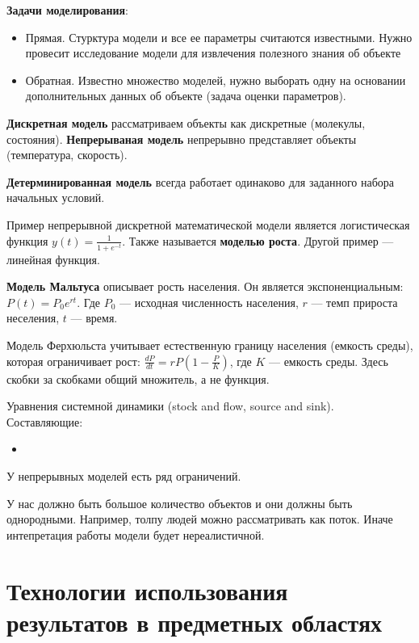 \textbf{Задачи моделирования}:
\begin{itemize}
    \item Прямая. Стурктура модели и все ее параметры считаются известными.
        Нужно провесит исследование модели для извлечения полезного знания об
        объекте

    \item Обратная. Известно множество моделей, нужно выборать одну на
        основании дополнительных данных об объекте (задача оценки параметров).
\end{itemize}

\textbf{Дискретная модель} рассматриваем объекты как дискретные (молекулы, состояния).
\textbf{Непрерываная модель} непрерывно представляет объекты (температура, скорость).

\textbf{Детерминированная модель} всегда работает одинаково для заданного набора
начальных условий.

Пример непрерывной дискретной математической модели является логистическая
функция $y(t) = \frac{1}{1 + e^{-t}}$. Также называется \textbf{моделью роста}.
Другой пример --- линейная функция.

\textbf{Модель Мальтуса} описывает рость населения. Он является экспоненциальным: $P(t)
= P_0 e^{rt}$. Где $P_0$ --- исходная численность населения, $r$ --- темп
прироста неселения, $t$ --- время.

Модель Ферхюльста учитывает естественную границу населения (емкость среды), которая
ограничивает рост: $\frac{dP}{dt} = rP(1 - \frac{P}{K})$, где $K$ --- емкость
среды. Здесь скобки за скобками общий множитель, а не функция.


Уравнения системной динамики (stock and flow, source and sink). Составляющие:
\begin{itemize}
    \item 
\end{itemize}

У непрерывных моделей есть ряд ограничений.

У нас должно быть большое количество объектов и они должны быть однородными.
Например, толпу людей можно рассматривать как поток. Иначе интепретация работы
модели будет нереалистичной.

\section{Технологии использования результатов в предметных областях}


